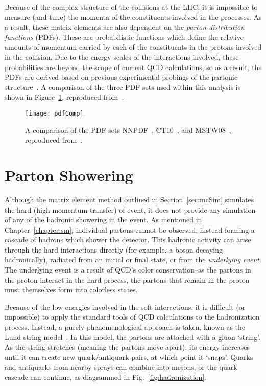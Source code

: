 Because of the complex structure of the collisions at the LHC, it is impossible to
measure (and tune) the momenta of the constituents involved in the processes. As
a result, these matrix elements are also dependent on the \emph{parton
distribution functions} (PDFs). These are probabilistic functions which define
the relative amounts of momentum carried by each of the constituents in the
protons involved in the collision. Due to the energy scales of the interactions
involved, these probabilities are beyond the scope of current QCD calculations,
so as a result, the PDFs are derived based on previous experimental probings of
the partonic structure~\cite{MSTW08,ct10,nnPDF}. A comparison of the three PDF
sets used within this analysis is shown in Figure~\ref{fig:pdfComp}, reproduced
from~\cite{pdfComp}.

\begin{figure}[h]
\centering
\texttt{[image: pdfComp]}
\caption[A comparison of three different PDF sets.]{A comparison of the PDF sets NNPDF~\cite{nnPDF}, CT10~\cite{ct10}, and
MSTW08~\cite{MSTW08}, reproduced from~\cite{pdfComp}.}
\label{fig:pdfComp}
\end{figure}

\section{Parton Showering} 
Although the matrix element method outlined in Section~\ref{sec:mcSim} simulates
the hard (high-momentum transfer) of event, it does not provide any simulation
of any of the hadronic showering in the event. As mentioned in
Chapter~\ref{chapter:sm}, individual partons cannot be observed, instead
forming a cascade of hadrons which shower the detector. This hadronic activity
can arise through the hard interactions directly (for example, a \Z boson
decaying hadronically), radiated from an initial or final state, or from the
\emph{underlying event}. The underlying event is a result of QCD's color
conservation--as the partons in the proton interact in the hard process, the
partons that remain in the proton must themselves form into colorless states.

Because of the low energies involved in the soft interactions, it is difficult
(or impossible) to apply the standard tools of QCD calculations to the
hadronization process. Instead, a purely phenomenological approach is taken,
known as the Lund string model~\cite{lundStringModel}. In this model, the partons are
attached with a gluon `string'. As the string stretches (meaning the partons
move apart), its energy increases until it can create new quark/antiquark
pairs, at which point it `snaps'. Quarks and antiquarks from nearby sprays can
combine into mesons, or the quark cascade can continue, as diagrammed in
Fig.~\ref{fig:hadronization}.

